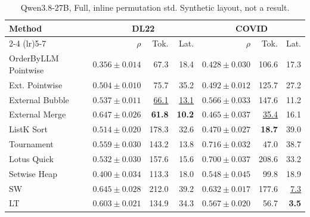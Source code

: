 \begin{table}[t]
\centering\footnotesize\setlength{\tabcolsep}{3.2pt}\renewcommand{\arraystretch}{1.12}
\caption{Qwen3.8-27B, Full, inline permutation std. Synthetic layout, not a result.}
\begin{tabular}{@{}lrrrrrr@{}}
\toprule
Method & \multicolumn{3}{c}{DL22} & \multicolumn{3}{c}{COVID} \\
\cmidrule(lr){2-4} \cmidrule(lr){5-7}
 & $\rho$ & Tok. & Lat. & $\rho$ & Tok. & Lat. \\
\midrule
OrderByLLM Pointwise & $0.356\pm0.014$ & 67.3 & 18.4 & $0.428\pm0.030$ & 106.6 & 17.3 \\
Ext. Pointwise & $0.504\pm0.010$ & 75.7 & 35.2 & $0.492\pm0.012$ & 125.7 & 27.2 \\
External Bubble & $0.537\pm0.011$ & \underline{66.1} & \underline{13.1} & $0.566\pm0.033$ & 147.6 & 11.2 \\
External Merge & \textbf{$0.647\pm0.026$} & \textbf{61.8} & \textbf{10.2} & $0.465\pm0.037$ & \underline{35.4} & 16.1 \\
ListK Sort & $0.514\pm0.020$ & 178.3 & 32.6 & $0.470\pm0.027$ & \textbf{18.7} & 39.0 \\
Tournament & $0.559\pm0.030$ & 143.2 & 13.8 & \textbf{$0.716\pm0.032$} & 47.0 & 38.7 \\
Lotus Quick & $0.532\pm0.030$ & 157.6 & 15.6 & \underline{$0.700\pm0.037$} & 208.6 & 33.2 \\
Setwise Heap & $0.400\pm0.034$ & 113.3 & 18.0 & $0.548\pm0.045$ & 99.8 & 18.9 \\
SW & \underline{$0.645\pm0.028$} & 212.0 & 39.2 & $0.632\pm0.017$ & 177.6 & \underline{7.3} \\
LT & $0.603\pm0.021$ & 134.9 & 34.3 & $0.567\pm0.020$ & 56.7 & \textbf{3.5} \\
\bottomrule
\end{tabular}
\end{table}

